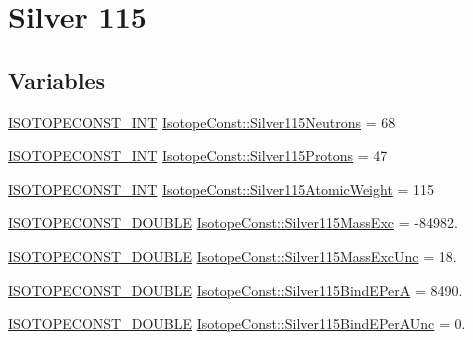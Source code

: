 \hypertarget{group___isotope_const-_silver-_ag115}{}\section{Silver 115}
\label{group___isotope_const-_silver-_ag115}
\subsection*{Variables}
\begin{DoxyCompactItemize}
\item 
\mbox{\hyperlink{group___isotope_const-_macros_ga5f18360b3e99483a35c32d789e62621c}{I\+S\+O\+T\+O\+P\+E\+C\+O\+N\+S\+T\+\_\+\+I\+NT}} \mbox{\hyperlink{group___isotope_const-_silver-_ag115_ga5c7c51f185b3b04164eedbdfc67ea523}{Isotope\+Const\+::\+Silver115\+Neutrons}} = 68
\item 
\mbox{\hyperlink{group___isotope_const-_macros_ga5f18360b3e99483a35c32d789e62621c}{I\+S\+O\+T\+O\+P\+E\+C\+O\+N\+S\+T\+\_\+\+I\+NT}} \mbox{\hyperlink{group___isotope_const-_silver-_ag115_gac3d9bca2bc86ba6689abd8cbf2ce46ca}{Isotope\+Const\+::\+Silver115\+Protons}} = 47
\item 
\mbox{\hyperlink{group___isotope_const-_macros_ga5f18360b3e99483a35c32d789e62621c}{I\+S\+O\+T\+O\+P\+E\+C\+O\+N\+S\+T\+\_\+\+I\+NT}} \mbox{\hyperlink{group___isotope_const-_silver-_ag115_ga42e6139051d41eb4236ddb42c54ddae5}{Isotope\+Const\+::\+Silver115\+Atomic\+Weight}} = 115
\item 
\mbox{\hyperlink{group___isotope_const-_macros_ga8f45a7272ce02c0b4c65c44636ed719a}{I\+S\+O\+T\+O\+P\+E\+C\+O\+N\+S\+T\+\_\+\+D\+O\+U\+B\+LE}} \mbox{\hyperlink{group___isotope_const-_silver-_ag115_gab55c4cd34a30c96ded305a9149bb4117}{Isotope\+Const\+::\+Silver115\+Mass\+Exc}} = -\/84982.
\item 
\mbox{\hyperlink{group___isotope_const-_macros_ga8f45a7272ce02c0b4c65c44636ed719a}{I\+S\+O\+T\+O\+P\+E\+C\+O\+N\+S\+T\+\_\+\+D\+O\+U\+B\+LE}} \mbox{\hyperlink{group___isotope_const-_silver-_ag115_gafc7c0cf6127b8121b0284573c3f4c6d9}{Isotope\+Const\+::\+Silver115\+Mass\+Exc\+Unc}} = 18.
\item 
\mbox{\hyperlink{group___isotope_const-_macros_ga8f45a7272ce02c0b4c65c44636ed719a}{I\+S\+O\+T\+O\+P\+E\+C\+O\+N\+S\+T\+\_\+\+D\+O\+U\+B\+LE}} \mbox{\hyperlink{group___isotope_const-_silver-_ag115_gaf8c0fc7cea0067a97e35e6d9e4097e0a}{Isotope\+Const\+::\+Silver115\+Bind\+E\+PerA}} = 8490.
\item 
\mbox{\hyperlink{group___isotope_const-_macros_ga8f45a7272ce02c0b4c65c44636ed719a}{I\+S\+O\+T\+O\+P\+E\+C\+O\+N\+S\+T\+\_\+\+D\+O\+U\+B\+LE}} \mbox{\hyperlink{group___isotope_const-_silver-_ag115_gaa6278f020a1e84d8fb101dac446d3412}{Isotope\+Const\+::\+Silver115\+Bind\+E\+Per\+A\+Unc}} = 0.

\end{DoxyCompactItemize}
